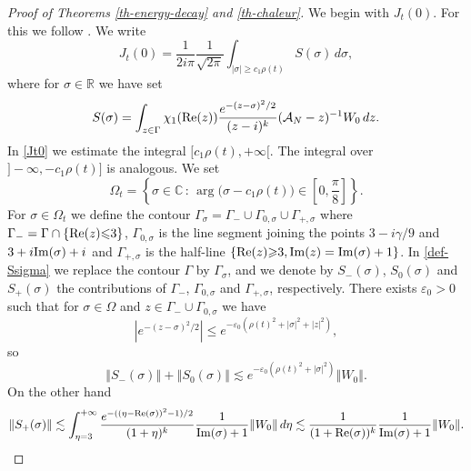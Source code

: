 \documentclass[10pt, a4paper,reqno]{amsart}
\theoremstyle{plain}
\theoremstyle{definition}
\theoremstyle{remark}
\begin{document}
\begin{proof}[Proof of Theorems \ref{th-energy-decay} and \ref{th-chaleur}]
{\noindent {\bf $\bullet$}\quad } We begin with $J_t(0)$. For this we follow \cite{lebeau96}. We write 
\begin{equation} \label{Jt0}
J_t(0) = \frac 1 {2i\pi}  \frac 1 {\sqrt {2\pi}}  \int_{{\left\vert {\sigma}\right\vert} {\geqslant} c_1 \rho(t)} S(\sigma) \, d\sigma,
\end{equation}
where for $\sigma \in {\mathbb{R}}$ we have set 
\begin{equation} \label{def-Ssigma}
S(\sigma) = \int_{z \in {\Gamma}} {\chi}_1({\mathop{\rm{Re}}\nolimits}(z)) \frac {e^{-(z-\sigma)^2 / 2} }{(z-i)^k} ({{{\mathcal A}}_N}-z){^{-1}} W_0 \, dz.
\end{equation}
In \eqref{Jt0} we estimate the integral $[c_1 \rho(t),+\infty[$. The integral over $]-\infty,-c_1\rho(t)]$ is analogous.
We set 
\[
{\Omega}_t = {\left\{ {\sigma \in {\mathbb{C}} {\,:\,} \arg \big( \sigma - c_1\rho(t)  \big) \in \left[0 , \frac \pi 8 \right]} \right\}}.
\]
For $\sigma \in {\Omega}_t$ we define the contour ${\Gamma}_\sigma = {\Gamma}_- \cup {\Gamma}_{0,\sigma} \cup {\Gamma}_{+,\sigma}$ where ${\Gamma}_- = {\Gamma} \cap {\left\{ {{\mathop{\rm{Re}}\nolimits}(z) {\leqslant} 3} \right\}}$, ${\Gamma}_{0,\sigma}$ is the line segment joining the points $3 - i{\gamma} /9$ and $3+i{\mathop{\rm{Im}}\nolimits}(\sigma) + i$ and ${\Gamma}_{+,\sigma}$ is the half-line ${\left\{ {{\mathop{\rm{Re}}\nolimits}(z) {\geqslant} 3, {\mathop{\rm{Im}}\nolimits}(z) = {\mathop{\rm{Im}}\nolimits}(\sigma) + 1} \right\}}$. In \eqref{def-Ssigma} we replace the contour ${\Gamma}$ by ${\Gamma}_\sigma$, and we denote by $S_-(\sigma)$, $S_0(\sigma)$ and $S_+(\sigma)$ the contributions of ${\Gamma}_-$, ${\Gamma}_{0,\sigma}$ and ${\Gamma}_{+,\sigma}$, respectively. There exists ${\varepsilon}_0 > 0$ such that for $\sigma \in {\Omega}$ and $z \in {\Gamma}_- \cup {\Gamma}_{0,\sigma}$ we have 
\[
{\left\vert {e^{-(z-\sigma)^2/2}}\right\vert} {\leqslant} e^{-{\varepsilon}_0(\rho(t)^2 + {\left\vert \sigma\right\vert}^2 + {\left\vert z\right\vert}^2)},
\]
so 
\begin{equation} \label{estim-S-}
{\left\Vert {S_-(\sigma)}\right\Vert} + {\left\Vert {S_0(\sigma)}\right\Vert} \lesssim e^{-{\varepsilon}_0(\rho(t)^2 + {\left\vert \sigma\right\vert}^2)} {\left\Vert {W_0}\right\Vert}.
\end{equation}
On the other hand
\begin{equation} \label{estim-S+}
{\left\Vert {S_+(\sigma)}\right\Vert} \lesssim \int_{{\eta} = 3}^{+\infty} \frac {e^{-(({\eta}-{\mathop{\rm{Re}}\nolimits}(\sigma))^2 - 1 )/2}}{(1+ {\eta})^k} \frac 1 {{\mathop{\rm{Im}}\nolimits}(\sigma)+1} {\left\Vert {W_0}\right\Vert} \, d{\eta} \lesssim \frac 1 {(1+{\mathop{\rm{Re}}\nolimits}(\sigma))^k} \frac 1 {{\mathop{\rm{Im}}\nolimits}(\sigma) +1}{\left\Vert {W_0}\right\Vert}.

\end{equation}
\end{proof}
\end{document}
